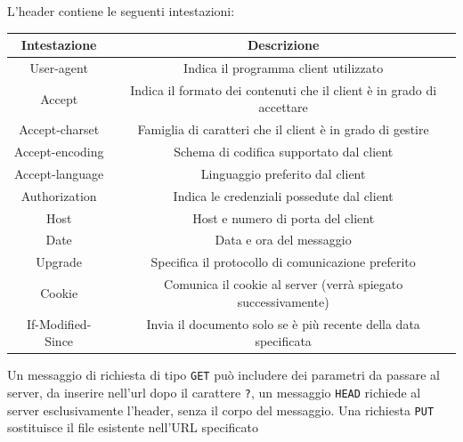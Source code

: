 \documentclass[12pt, letterpaper]{article}
\newcommand{\code}[1]{\colorbox{light-gray}{\texttt{#1}}}
\begin{document}
L'header contiene le seguenti intestazioni:\begin{center}
    \begin{tabular}{|c|c|}
        \hline
        \rowcolor[HTML]{C0C0C0} 
        \textbf{Intestazione} & \textbf{Descrizione}                                                  \\ \hline
        \rowcolor[HTML]{FFFFFF} 
        User-agent            & Indica il programma client utilizzato                                 \\ \hline
        \rowcolor[HTML]{FFFFFF} 
        Accept                & Indica il formato dei contenuti che il client è in grado di accettare \\ \hline
        \rowcolor[HTML]{FFFFFF} 
        Accept-charset        & Famiglia di caratteri che il client è in grado di gestire             \\ \hline
        Accept-encoding       & Schema di codifica supportato dal client                              \\ \hline
        Accept-language       & Linguaggio preferito dal client                                       \\ \hline
        Authorization         & Indica le credenziali possedute dal client                            \\ \hline
        \rowcolor[HTML]{FFFFFF} 
        Host                  & Host e numero di porta del client                                     \\ \hline
        \rowcolor[HTML]{FFFFFF} 
        Date                  & Data e ora del messaggio                                              \\ \hline
        \rowcolor[HTML]{FFFFFF} 
        Upgrade               & Specifica il protocollo di comunicazione preferito                    \\ \hline
        Cookie                & Comunica il cookie al server (verrà spiegato successivamente)         \\ \hline
        If-Modified-Since     & Invia il documento solo se è più recente della data specificata       \\ \hline
        \end{tabular}
\end{center}
Un messaggio di richiesta di tipo \code{GET} può includere dei parametri da passare al server, da inserire 
nell'url dopo il carattere \code{?}, un messaggio \code{HEAD} richiede al server esclusivamente l'header, 
senza il corpo del messaggio. Una richiesta \code{PUT} sostituisce il file esistente nell'URL specificato 
\end{document}
